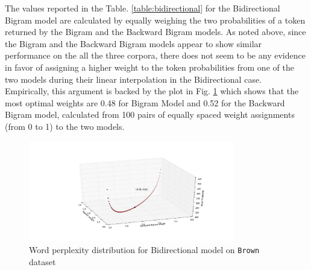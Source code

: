 \documentclass[12pt]{article}
\begin{document}
The values reported in the Table. \ref{table:bidirectional} for the Bidirectional Bigram model are calculated by equally weighing the two probabilities of  a token returned by the Bigram and the Backward Bigram models. As noted above, since the Bigram and the Backward Bigram models appear to show similar performance on the all the three corpora, there does not seem to be any evidence in favor of assigning a higher weight to the token probabilities from one of the two models during their linear interpolation in the Bidirectional case. Empirically, this argument is backed by the plot in Fig. \ref{fig} which shows that the most optimal weights are 0.48 for Bigram Model and 0.52 for the Backward Bigram model, calculated from 100 pairs of equally spaced weight assignments (from 0 to 1) to the two models.

\begin{figure}
\centering
\includegraphics[width=0.8\textwidth]{fig}
\caption{Word perplexity distribution for Bidirectional model on \texttt{Brown} dataset}
\label{fig}
\end{figure}

\end{document}
